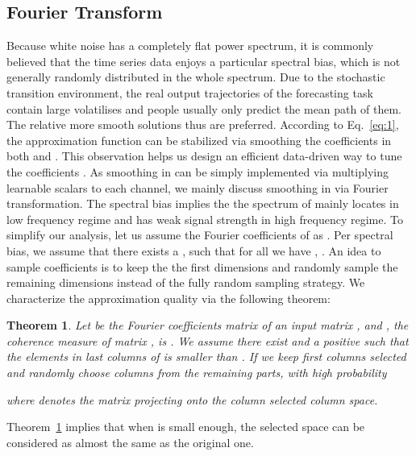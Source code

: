 \documentclass{article}
\newtheorem{theorem}{Theorem}
\begin{document}
\subsection{Fourier Transform}
Because white noise has a completely flat power spectrum, it is commonly believed that the time series data enjoys a particular spectral bias, which is not generally randomly distributed in the whole spectrum.
Due to the stochastic transition environment, the real output trajectories of the forecasting task contain large volatilises and people usually only predict the mean path of them. The relative more smooth solutions thus are preferred. According to Eq.~\eqref{eq:1},  the approximation function  can be stabilized via smoothing the coefficients  in both  and . This observation helps us design an efficient data-driven way to tune the coefficients . As smoothing in  can be simply implemented via multiplying learnable scalars to each channel, we mainly discuss smoothing  in  via Fourier transformation. The spectral bias implies the the spectrum of  mainly locates in low frequency regime and has weak signal strength in high frequency regime. To simplify our analysis, let us assume the Fourier coefficients of  as . Per spectral bias, we assume that there exists a , such that for all  we have , . An idea to sample coefficients is to keep the the first  dimensions and randomly sample the remaining dimensions instead of the fully random sampling strategy. We characterize the approximation quality via the following theorem:

\begin{theorem}
\label{thm_Fourier} 
Let  be the Fourier coefficients matrix of an input matrix , and , the coherence measure of matrix , is . We assume there exist  and  a positive  such that the elements in last  columns of  is smaller than . If we keep first  columns selected and randomly choose  columns from the remaining parts, with high probability

where   denotes the matrix projecting  onto the column selected column space.
\end{theorem}
Theorem~\ref{thm_Fourier} implies that when  is small enough, the selected space can be considered as almost the same as the original one.












%
\end{document}
